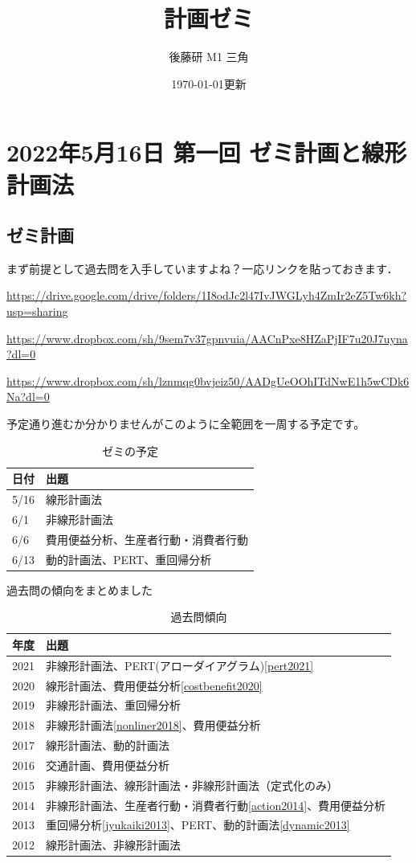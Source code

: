 \documentclass{jsarticle}
\title{計画ゼミ}
\author{後藤研 M1 三角}
\date{\today 更新}
\begin{document}
\maketitle

\tableofcontents

\section{2022年5月16日 第一回 ゼミ計画と線形計画法}

\subsection{ゼミ計画}

まず前提として過去問を入手していますよね？一応リンクを貼っておきます．

\url{https://drive.google.com/drive/folders/1I8odJc2l47IvJWGLyh4ZmIr2eZ5Tw6kh?usp=sharing}

\url{https://www.dropbox.com/sh/9sem7v37gpnvuia/AACnPxe8HZaPjIF7u20J7uyna?dl=0}

\url{https://www.dropbox.com/sh/lznmqg0bvjeiz50/AADgUeOOhITdNwE1h5wCDk6Na?dl=0}

予定通り進むか分かりませんがこのように全範囲を一周する予定です。
\begin{table}[htbp]
  \caption{ゼミの予定\label{table:plan}}
  \centering
  \begin{tabular}{ll}
    \hline
    日付 & 出題\\
    \hline \hline
    5/16&線形計画法\\
    6/1&非線形計画法\\
    6/6&費用便益分析、生産者行動・消費者行動\\
    6/13&動的計画法、PERT、重回帰分析\\
    \hline
  \end{tabular}
\end{table}

過去問の傾向をまとめました
\begin{table}[htbp]
  \caption{過去問傾向\label{table:kakomon}}
  \centering
  \begin{tabular}{ll}
    \hline
    年度 & 出題\\
    \hline \hline
    2021&非線形計画法、PERT(アローダイアグラム)\ref{pert2021} \\
    2020&線形計画法、費用便益分析\ref{costbenefit2020}\\
    2019&非線形計画法、重回帰分析\\
    2018&非線形計画法\ref{nonliner2018}、費用便益分析\\
    2017&線形計画法、動的計画法\\
    2016&交通計画、費用便益分析\\
    2015&非線形計画法、線形計画法・非線形計画法（定式化のみ）\\
    2014&非線形計画法、生産者行動・消費者行動\ref{action2014}、費用便益分析\\
    2013&重回帰分析\ref{jyukaiki2013}、PERT、動的計画法\ref{dynamic2013}\\
    2012&線形計画法、非線形計画法\\
    \hline
  \end{tabular}
\end{table}
\end{document}
